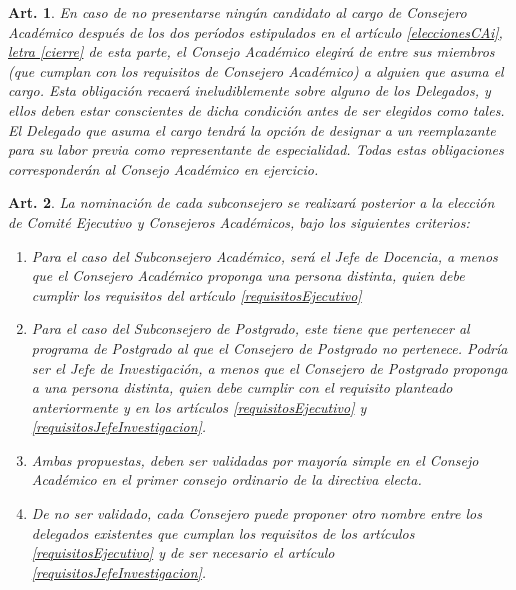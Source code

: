 \documentclass[letterpaper,11pt]{article}
\theoremstyle{plain}
\newtheorem{art}{Art.} %
\newcommand{\aaref}[2]{\hyperref[#2]{\ref*{#1}, letra \ref*{#2}}}
\begin{document}
		\begin{art}\label{eleccionExtraordinariaCAPregrado}
			En caso de no presentarse ningún candidato al cargo de Consejero Académico después de los dos períodos estipulados en el artículo \aaref{eleccionesCAi}{cierre} de esta parte, el Consejo Académico elegirá de entre sus miembros (que cumplan con los requisitos de Consejero Académico) a alguien que asuma el cargo. Esta obligación recaerá ineludiblemente sobre alguno de los Delegados, y ellos deben estar conscientes de dicha condición antes de ser elegidos como tales. El Delegado que asuma el cargo tendrá la opción de designar a un reemplazante para su labor previa como representante de especialidad. Todas estas obligaciones corresponderán al Consejo Académico en ejercicio.
		\end{art}

		\begin{art}\label{nominacionSubconsejeros}
			La nominación de cada subconsejero se realizará posterior a la elección de Comité Ejecutivo y Consejeros Académicos, bajo los siguientes criterios:
			\begin{enumerate}
				\item Para el caso del Subconsejero Académico, será el Jefe de Docencia, a menos que el Consejero Académico proponga una persona distinta, quien debe cumplir los requisitos del artículo \ref{requisitosEjecutivo}
				
				\item Para el caso del Subconsejero de Postgrado, este tiene que pertenecer al programa de Postgrado al que el Consejero de Postgrado no pertenece. Podría ser el Jefe de Investigación, a menos que el Consejero de Postgrado proponga a una persona distinta, quien debe cumplir con el requisito planteado anteriormente y en los artículos \ref{requisitosEjecutivo} y \ref{requisitosJefeInvestigacion}. 
				
				\item Ambas propuestas, deben ser validadas por mayoría simple en el Consejo Académico en el primer consejo ordinario de la directiva electa.
				
				\item De no ser validado, cada Consejero puede proponer otro nombre entre los delegados existentes que cumplan los requisitos de los artículos \ref{requisitosEjecutivo} y de ser necesario el artículo \ref{requisitosJefeInvestigacion}. 
			\end{enumerate}
		\end{art}
\end{document}

